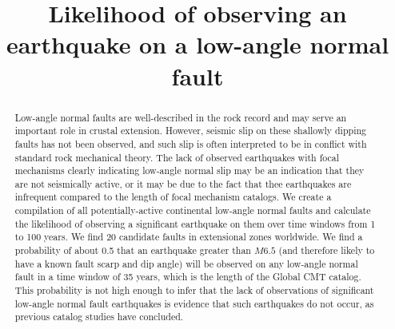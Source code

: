 \documentclass[twocolumn,grl]{AGUTeX}
\begin{document}
\title{Likelihood of observing an earthquake on a low-angle normal fault}



\begin{abstract}
Low-angle normal faults are well-described in the rock record and may serve
an important role in crustal extension.  However, seismic slip on these
shallowly dipping faults  has not been observed, and such slip is often 
interpreted to be in conflict with standard rock mechanical theory.
The lack of observed earthquakes with focal mechanisms clearly indicating low-angle normal slip may be an
indication that they are not seismically active, or it may be due to the fact that thee earthquakes are infrequent compared to the length of focal mechanism catalogs.   
We create a compilation of all potentially-active continental low-angle normal
faults and calculate the likelihood of observing a significant earthquake on 
them over time windows from 1 to 100 years. We find 20 candidate faults in
extensional zones worldwide.  We find a probability of about 0.5 that an
earthquake greater than $M6.5$ (and therefore likely to have a known fault
scarp and dip angle) will be observed on any low-angle normal fault 
in a time window of 35 years, which is the length of the Global CMT catalog.
This probability is not high enough to infer that the
lack of observations of significant low-angle normal fault earthquakes is
evidence that such earthquakes do not occur, as previous catalog studies
have concluded.

\end{abstract}
\end{document}
